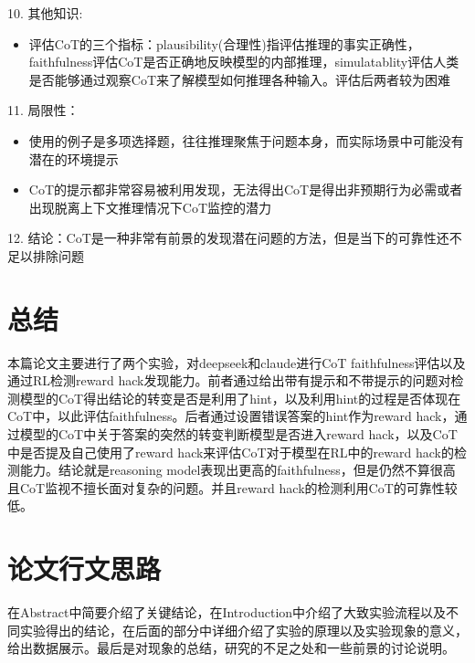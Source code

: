 \documentclass[a4paper,12pt]{article}
\begin{document}
10. 其他知识:
\begin{itemize}
    \item 评估CoT的三个指标：plausibility(合理性)指评估推理的事实正确性，faithfulness评估CoT是否正确地反映模型的内部推理，simulatablity评估人类是否能够通过观察CoT来了解模型如何推理各种输入。评估后两者较为困难
\end{itemize}

11. 局限性：
\begin{itemize}
    \item 使用的例子是多项选择题，往往推理聚焦于问题本身，而实际场景中可能没有潜在的环境提示
    \item CoT的提示都非常容易被利用发现，无法得出CoT是得出非预期行为必需或者出现脱离上下文推理情况下CoT监控的潜力
\end{itemize}

12. 结论：CoT是一种非常有前景的发现潜在问题的方法，但是当下的可靠性还不足以排除问题

\section{总结}
本篇论文主要进行了两个实验，对deepseek和claude进行CoT faithfulness评估以及通过RL检测reward hack发现能力。前者通过给出带有提示和不带提示的问题对检测模型的CoT得出结论的转变是否是利用了hint，以及利用hint的过程是否体现在CoT中，以此评估faithfulness。后者通过设置错误答案的hint作为reward hack，通过模型的CoT中关于答案的突然的转变判断模型是否进入reward hack，以及CoT中是否提及自己使用了reward hack来评估CoT对于模型在RL中的reward hack的检测能力。结论就是reasoning model表现出更高的faithfulness，但是仍然不算很高且CoT监视不擅长面对复杂的问题。并且reward hack的检测利用CoT的可靠性较低。

\section{论文行文思路}
在Abstract中简要介绍了关键结论，在Introduction中介绍了大致实验流程以及不同实验得出的结论，在后面的部分中详细介绍了实验的原理以及实验现象的意义，给出数据展示。最后是对现象的总结，研究的不足之处和一些前景的讨论说明。
\end{document}
